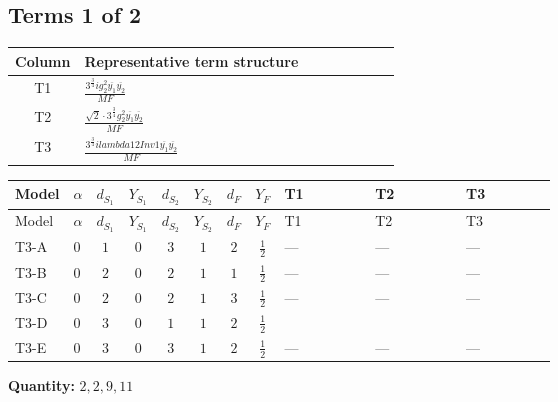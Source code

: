 \documentclass[8pt]{article}
\begin{document}
\begin{landscape}
\subsection*{Terms 1 of 2}
\begin{center}
\begin{tabular}{@{}c >{\raggedright\arraybackslash}p{0.82\linewidth}@{}}
\toprule
Column & Representative term structure \\
\midrule
T1 & \(\displaystyle \frac{3^{\frac{3}{4}} i g_{2}^{2} \overline{y_{1}} \overline{y_{2}}}{MF}\) \\
\midrule
T2 & \(\displaystyle \frac{\sqrt{2} \cdot 3^{\frac{3}{4}} g_{2}^{2} \overline{y_{1}} \overline{y_{2}}}{MF}\) \\
\midrule
T3 & \(\displaystyle \frac{3^{\frac{3}{4}} i lambda12Inv1 \overline{y_{1}} \overline{y_{2}}}{MF}\) \\
\midrule
\bottomrule
\end{tabular}
\end{center}
\smallskip
\tiny
\begin{longtable}{@{}llcccccc >{\raggedright\arraybackslash}p{0.21\linewidth} >{\raggedright\arraybackslash}p{0.21\linewidth} >{\raggedright\arraybackslash}p{0.21\linewidth}@{}}
\toprule
Model & $\alpha$ & $d_{S_1}$ & $Y_{S_1}$ & $d_{S_2}$ & $Y_{S_2}$ & $d_F$ & $Y_F$ & T1 & T2 & T3 \\
\midrule
\endfirsthead
\toprule
Model & $\alpha$ & $d_{S_1}$ & $Y_{S_1}$ & $d_{S_2}$ & $Y_{S_2}$ & $d_F$ & $Y_F$ & T1 & T2 & T3 \\
\midrule
\endhead
T3-A & $0$ & $1$ & $0$ & $3$ & $1$ & $2$ & $\frac{1}{2}$ & --- & --- & --- \\
\midrule
T3-B & $0$ & $2$ & $0$ & $2$ & $1$ & $1$ & $\frac{1}{2}$ & --- & --- & --- \\
\midrule
T3-C & $0$ & $2$ & $0$ & $2$ & $1$ & $3$ & $\frac{1}{2}$ & --- & --- & --- \\
\midrule
T3-D & $0$ & $3$ & $0$ & $1$ & $1$ & $2$ & $\frac{1}{2}$ & \scriptsize\adjustbox{max width=\linewidth}{$\begin{gathered} - \frac{17 \cdot 3^{\frac{3}{4}} i g_{2}^{2} \overline{y_{1}} \overline{y_{2}}}{24 MF}\end{gathered}$} & \scriptsize\adjustbox{max width=\linewidth}{$\begin{gathered} - \frac{\sqrt{2} \cdot 3^{\frac{3}{4}} g_{2}^{2} \overline{y_{1}} \overline{y_{2}}}{3 MF}\end{gathered}$} & \scriptsize\adjustbox{max width=\linewidth}{$\begin{gathered} - \frac{3^{\frac{3}{4}} i lambda12Inv1 \overline{y_{1}} \overline{y_{2}}}{6 MF}\end{gathered}$} \\
\midrule
T3-E & $0$ & $3$ & $0$ & $3$ & $1$ & $2$ & $\frac{1}{2}$ & --- & --- & --- \\
\midrule
\bottomrule
\end{longtable}
\clearpage
\noindent\textbf{Quantity: }$\mathrm{2,2,9,11}$\par\smallskip

\end{landscape}
\end{document}
